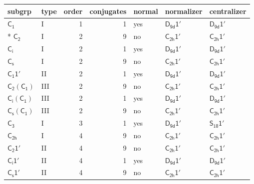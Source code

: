\documentclass[10pt,a4paper]{article}
\numberwithin{equation}{section}
\newcommand{\grp}[1]{\mathsf{#1}}
\begin{document}
{\small\begin{longtable}{@{}llrrlll@{}}\toprule
subgrp & type & order & conjugates & normal & normalizer & centralizer\\\midrule\endhead
\bottomrule\endfoot\endlastfoot
\href{../../../rotation/data/pdf/C1.pdf}{$\grp{C_{1}}$} & I & 1 & 1 & yes & \href{D9d-1p.pdf}{$\grp{D_{9d}1'}$} & \href{D9d-1p.pdf}{$\grp{D_{9d}1'}$}\\*
\href{../../../rotation/data/pdf/C2.pdf}{$\grp{C_{2}}$} & I & 2 & 9 & no & \href{C2h-1p.pdf}{$\grp{C_{2h}1'}$} & \href{C2h-1p.pdf}{$\grp{C_{2h}1'}$}\\
\href{../../../rotation/data/pdf/S2.pdf}{$\grp{C_{i}}$} & I & 2 & 1 & yes & \href{D9d-1p.pdf}{$\grp{D_{9d}1'}$} & \href{D9d-1p.pdf}{$\grp{D_{9d}1'}$}\\
\href{../../../rotation/data/pdf/C1v.pdf}{$\grp{C_{s}}$} & I & 2 & 9 & no & \href{C2h-1p.pdf}{$\grp{C_{2h}1'}$} & \href{C2h-1p.pdf}{$\grp{C_{2h}1'}$}\\
\href{C1-1p.pdf}{$\grp{C_{1}1'}$} & II & 2 & 1 & yes & \href{D9d-1p.pdf}{$\grp{D_{9d}1'}$} & \href{D9d-1p.pdf}{$\grp{D_{9d}1'}$}\\
\href{C2-C1.pdf}{$\grp{C_{2}}(\grp{C_{1}})$} & III & 2 & 9 & no & \href{C2h-1p.pdf}{$\grp{C_{2h}1'}$} & \href{C2h-1p.pdf}{$\grp{C_{2h}1'}$}\\
\href{S2-C1.pdf}{$\grp{C_{i}}(\grp{C_{1}})$} & III & 2 & 1 & yes & \href{D9d-1p.pdf}{$\grp{D_{9d}1'}$} & \href{D9d-1p.pdf}{$\grp{D_{9d}1'}$}\\
\href{C1v-C1.pdf}{$\grp{C_{s}}(\grp{C_{1}})$} & III & 2 & 9 & no & \href{C2h-1p.pdf}{$\grp{C_{2h}1'}$} & \href{C2h-1p.pdf}{$\grp{C_{2h}1'}$}\\
\href{../../../rotation/data/pdf/C3.pdf}{$\grp{C_{3}}$} & I & 3 & 1 & yes & \href{D9d-1p.pdf}{$\grp{D_{9d}1'}$} & \href{S18-1p.pdf}{$\grp{S_{18}1'}$}\\
\href{../../../rotation/data/pdf/C2h.pdf}{$\grp{C_{2h}}$} & I & 4 & 9 & no & \href{C2h-1p.pdf}{$\grp{C_{2h}1'}$} & \href{C2h-1p.pdf}{$\grp{C_{2h}1'}$}\\
\href{C2-1p.pdf}{$\grp{C_{2}1'}$} & II & 4 & 9 & no & \href{C2h-1p.pdf}{$\grp{C_{2h}1'}$} & \href{C2h-1p.pdf}{$\grp{C_{2h}1'}$}\\
\href{S2-1p.pdf}{$\grp{C_{i}1'}$} & II & 4 & 1 & yes & \href{D9d-1p.pdf}{$\grp{D_{9d}1'}$} & \href{D9d-1p.pdf}{$\grp{D_{9d}1'}$}\\
\href{C1v-1p.pdf}{$\grp{C_{s}1'}$} & II & 4 & 9 & no & \href{C2h-1p.pdf}{$\grp{C_{2h}1'}$} & \href{C2h-1p.pdf}{$\grp{C_{2h}1'}$}\\

\end{longtable}}
\end{document}
